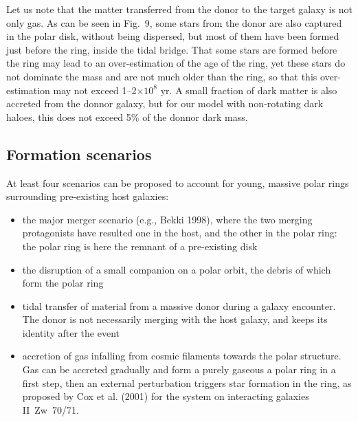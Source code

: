 \documentclass[]{aa}
\begin{document}
Let us note that the matter transferred from the donor to the 
target galaxy is not only gas. As can be seen in Fig.~9, some stars 
from the donor are also captured in the polar disk, without being 
dispersed, but most of them have been formed just before the ring, inside 
the tidal bridge. That some stars are formed before the ring may lead 
to an over-estimation of the age of the ring, yet these stars do not 
dominate the mass and are not much older than the ring, so that this 
over-estimation may not exceed 1--2$\times 10^8$ yr. A small fraction of 
dark matter is also accreted from the donnor galaxy, but for our model with 
non-rotating dark haloes, this does not exceed 5\% of the donnor dark mass.


\subsection{Formation scenarios}

At least four scenarios can be proposed to account for young, massive 
polar rings surrounding pre-existing host galaxies:

\begin{itemize}

\item the major merger scenario (e.g., Bekki 1998), where the two 
merging protagonists have resulted one in the host, and the other in 
the polar ring: the polar ring is here the remnant of a pre-existing disk

\item the disruption of a small companion on a polar orbit, the debris 
of which form the polar ring

\item tidal transfer of material from a massive donor during a galaxy 
encounter. The donor is not necessarily merging with the host galaxy, 
and keeps its identity after the event

\item accretion of gas infalling from cosmic filaments towards the 
polar structure. Gas can be accreted gradually and form a purely 
gaseous a polar ring in a first step, then an external perturbation 
triggers star formation in the ring, as proposed by Cox et al. (2001) 
for the system on interacting galaxies II~Zw~70/71.

\end{itemize}
\end{document}
